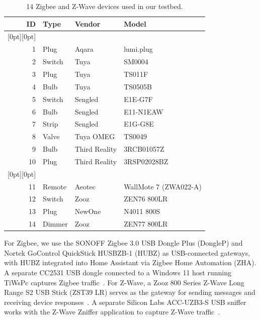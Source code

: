 \documentclass[10pt,journal,compsoc]{IEEEtran}
\begin{document}
\begin{table}[t]
\centering
\caption{14 Zigbee and Z-Wave devices used in our testbed.}\label{tab:reference-devices}
\small
\renewcommand{\arraystretch}{1.15}
\begin{tabularx}{\columnwidth}{@{}r l l >{\raggedright\arraybackslash}X@{}}
\toprule
\textbf{ID} & \textbf{Type} & \textbf{Vendor} & \textbf{Model} \\
\midrule
\rowcolor{zigbeebg}[0pt][0pt]\multicolumn{4}{@{}l@{}}{\textbf{Zigbee}} \\
1 & Plug & Aqara & lumi.plug \\
2 & Switch & Tuya & SM0004 \\
3 & Plug & Tuya & TS011F \\
4 & Bulb & Tuya & TS0505B \\
5 & Switch & Sengled & E1E-G7F \\
6 & Bulb & Sengled & E11-N1EAW \\
7 & Strip & Sengled & E1G-G8E \\
8 & Valve & Tuya OMEG & TS0049 \\
9 & Bulb & Third Reality & 3RCB01057Z \\
10 & Plug & Third Reality & 3RSP02028BZ \\
\rowcolor{zwavebg}[0pt][0pt]\multicolumn{4}{@{}l@{}}{\textbf{Z-Wave}} \\
11 & Remote & Aeotec & WallMote 7 (ZWA022-A) \\
12 & Switch & Zooz & ZEN76 800LR \\
13 & Plug & NewOne & N4011 800S \\
14 & Dimmer & Zooz & ZEN77 800LR \\
\bottomrule
\end{tabularx}
\end{table}

For Zigbee, we use the SONOFF Zigbee 3.0 USB Dongle Plus (DongleP) and Nortek GoControl QuickStick HUSBZB-1 (HUBZ) as USB-connected gateways, with HUBZ integrated into Home Assistant via Zigbee Home Automation (ZHA). A separate CC2531 USB dongle connected to a Windows 11 host running TiWsPc captures Zigbee traffic~\cite{zvdetector}. For Z-Wave, a Zooz 800 Series Z-Wave Long Range S2 USB Stick (ZST39 LR) serves as the gateway for sending messages and receiving device responses~\cite{zst39manual}. A separate Silicon Labs ACC-UZB3-S USB sniffer works with the Z-Wave Zniffer application to capture Z-Wave traffic~\cite{uzbmanual}.
\end{document}
